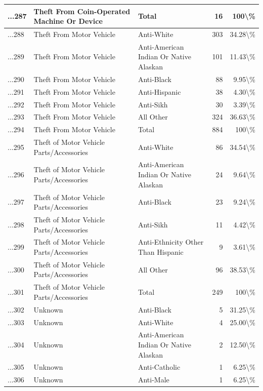 \documentclass[
]{krantz}
\begin{document}
\begin{longtable}[t]{l|l|l|r|r}
...287 & Theft From Coin-Operated Machine Or Device & Total & 16 & 100\textbackslash{}\%\\
\hline
...288 & Theft From Motor Vehicle & Anti-White & 303 & 34.28\textbackslash{}\%\\
\hline
...289 & Theft From Motor Vehicle & Anti-American Indian Or Native Alaskan & 101 & 11.43\textbackslash{}\%\\
\hline
...290 & Theft From Motor Vehicle & Anti-Black & 88 & 9.95\textbackslash{}\%\\
\hline
...291 & Theft From Motor Vehicle & Anti-Hispanic & 38 & 4.30\textbackslash{}\%\\
\hline
...292 & Theft From Motor Vehicle & Anti-Sikh & 30 & 3.39\textbackslash{}\%\\
\hline
...293 & Theft From Motor Vehicle & All Other & 324 & 36.63\textbackslash{}\%\\
\hline
...294 & Theft From Motor Vehicle & Total & 884 & 100\textbackslash{}\%\\
\hline
...295 & Theft of Motor Vehicle Parts/Accessories & Anti-White & 86 & 34.54\textbackslash{}\%\\
\hline
...296 & Theft of Motor Vehicle Parts/Accessories & Anti-American Indian Or Native Alaskan & 24 & 9.64\textbackslash{}\%\\
\hline
...297 & Theft of Motor Vehicle Parts/Accessories & Anti-Black & 23 & 9.24\textbackslash{}\%\\
\hline
...298 & Theft of Motor Vehicle Parts/Accessories & Anti-Sikh & 11 & 4.42\textbackslash{}\%\\
\hline
...299 & Theft of Motor Vehicle Parts/Accessories & Anti-Ethnicity Other Than Hispanic & 9 & 3.61\textbackslash{}\%\\
\hline
...300 & Theft of Motor Vehicle Parts/Accessories & All Other & 96 & 38.53\textbackslash{}\%\\
\hline
...301 & Theft of Motor Vehicle Parts/Accessories & Total & 249 & 100\textbackslash{}\%\\
\hline
...302 & Unknown & Anti-Black & 5 & 31.25\textbackslash{}\%\\
\hline
...303 & Unknown & Anti-White & 4 & 25.00\textbackslash{}\%\\
\hline
...304 & Unknown & Anti-American Indian Or Native Alaskan & 2 & 12.50\textbackslash{}\%\\
\hline
...305 & Unknown & Anti-Catholic & 1 & 6.25\textbackslash{}\%\\
\hline
...306 & Unknown & Anti-Male & 1 & 6.25\textbackslash{}\%\\

\end{longtable}
\end{document}
